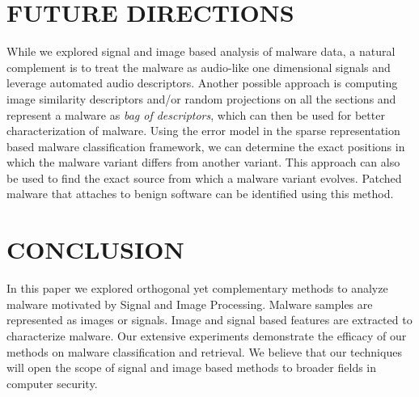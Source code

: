 \documentclass[journal]{IEEEtran}
\begin{document}
\section*{FUTURE DIRECTIONS}
While we explored signal and image based analysis of malware data, a natural complement is to treat the malware as audio-like one dimensional signals and leverage automated audio descriptors.
Another possible approach is computing image similarity descriptors and/or random projections on all the sections and represent a malware as \emph{bag of descriptors}, which can then be used for better characterization of malware.
Using the error model in the sparse representation based malware classification framework, we can determine the exact positions in which the malware variant differs from another variant.
This approach can also be used to find the exact source from which a malware variant evolves.
Patched malware that attaches to benign software can be identified using this method.


\section*{CONCLUSION}

In this paper we explored orthogonal yet complementary methods to analyze malware motivated by Signal and Image Processing.
Malware samples are represented as images or signals.
Image and signal based features are extracted to characterize malware.
Our extensive experiments demonstrate the efficacy of our methods on malware classification and retrieval.
We believe that our techniques will open the scope of signal and image based methods to broader fields in computer security.
\end{document}
